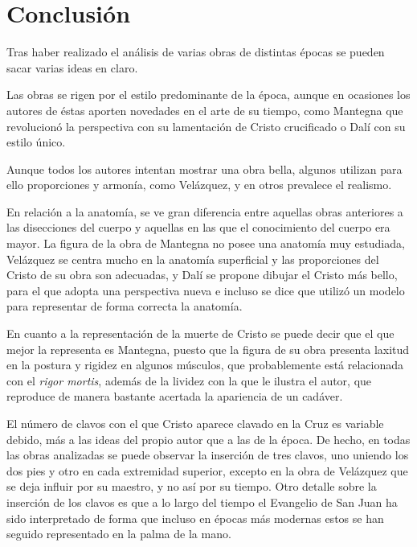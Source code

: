 \section{Conclusión}
Tras haber realizado el análisis de varias obras de distintas épocas se pueden sacar varias ideas en claro.

Las obras se rigen por el estilo predominante de la época, aunque en ocasiones los autores de éstas aporten novedades en el arte de su tiempo, como Mantegna que revolucionó la perspectiva con su lamentación de Cristo crucificado o Dalí con su estilo único.

Aunque todos los autores intentan mostrar una obra bella, algunos utilizan para ello proporciones y armonía, como Velázquez, y en otros prevalece el realismo.

En relación a la anatomía, se ve gran diferencia entre aquellas obras anteriores a las disecciones del cuerpo y aquellas en las que el conocimiento del cuerpo era mayor. La figura de la obra de Mantegna no posee una anatomía muy estudiada, Velázquez se centra mucho en la anatomía superficial y las proporciones del Cristo de su obra son adecuadas, y Dalí se propone dibujar el Cristo más bello, para el que adopta una perspectiva nueva e incluso se dice que utilizó un modelo para representar de forma correcta la anatomía.

En cuanto a la representación de la muerte de Cristo se puede decir que el que mejor la representa es Mantegna, puesto que la figura de su obra presenta laxitud en la postura y rigidez en algunos músculos, que probablemente está relacionada con el \textit{rigor mortis}, además de la lividez con la que le ilustra el autor, que reproduce de manera bastante acertada la apariencia de un cadáver.

El número de clavos con el que Cristo aparece clavado en la Cruz es variable debido, más a las ideas del propio autor que a las de la época. De hecho, en todas las obras analizadas se puede observar la inserción de tres clavos, uno uniendo los dos pies y otro en cada extremidad superior, excepto en la obra de Velázquez que se deja influir por su maestro, y no así por su tiempo. Otro detalle sobre la inserción de los clavos es que a lo largo del tiempo el Evangelio de San Juan ha sido interpretado de forma que incluso en épocas más modernas estos se han seguido representado en la palma de la mano.